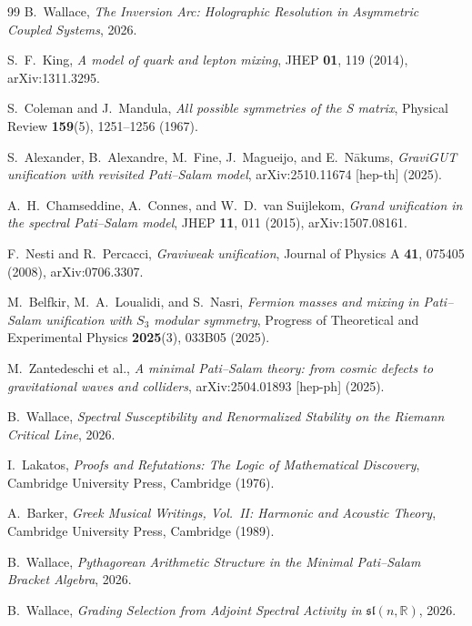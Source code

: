 \documentclass[11pt,a4paper]{article}
\theoremstyle{plain}
\theoremstyle{definition}
\theoremstyle{remark}
\begin{document}
\begin{thebibliography}{99}
B.~Wallace,
\textit{The Inversion Arc: Holographic Resolution in Asymmetric Coupled Systems},
2026.

S.~F.~King, \textit{A model of quark and lepton mixing},
JHEP \textbf{01}, 119 (2014), arXiv:1311.3295.

S.~Coleman and J.~Mandula,
\textit{All possible symmetries of the S matrix},
Physical Review \textbf{159}(5), 1251--1256 (1967).

S.~Alexander, B.~Alexandre, M.~Fine, J.~Magueijo, and E.~N\={a}kums,
\textit{GraviGUT unification with revisited Pati--Salam model},
arXiv:2510.11674 [hep-th] (2025).

A.~H.~Chamseddine, A.~Connes, and W.~D.~van Suijlekom,
\textit{Grand unification in the spectral Pati--Salam model},
JHEP \textbf{11}, 011 (2015), arXiv:1507.08161.

F.~Nesti and R.~Percacci,
\textit{Graviweak unification},
Journal of Physics A \textbf{41}, 075405 (2008), arXiv:0706.3307.

M.~Belfkir, M.~A.~Loualidi, and S.~Nasri,
\textit{Fermion masses and mixing in Pati--Salam unification with $S_3$ modular symmetry},
Progress of Theoretical and Experimental Physics \textbf{2025}(3), 033B05 (2025).

M.~Zantedeschi et al.,
\textit{A minimal Pati--Salam theory: from cosmic defects to gravitational waves and colliders},
arXiv:2504.01893 [hep-ph] (2025).

B.~Wallace,
\textit{Spectral Susceptibility and Renormalized Stability on the Riemann Critical Line},
2026.

I.~Lakatos,
\textit{Proofs and Refutations: The Logic of Mathematical Discovery},
Cambridge University Press, Cambridge (1976).

A.~Barker,
\textit{Greek Musical Writings, Vol.~II: Harmonic and Acoustic Theory},
Cambridge University Press, Cambridge (1989).

B.~Wallace,
\textit{Pythagorean Arithmetic Structure in the Minimal Pati--Salam
Bracket Algebra},
2026.

B.~Wallace,
\textit{Grading Selection from Adjoint Spectral Activity
in $\mathfrak{sl}(n,\mathbb{R})$},
2026.

\end{thebibliography}
\end{document}
